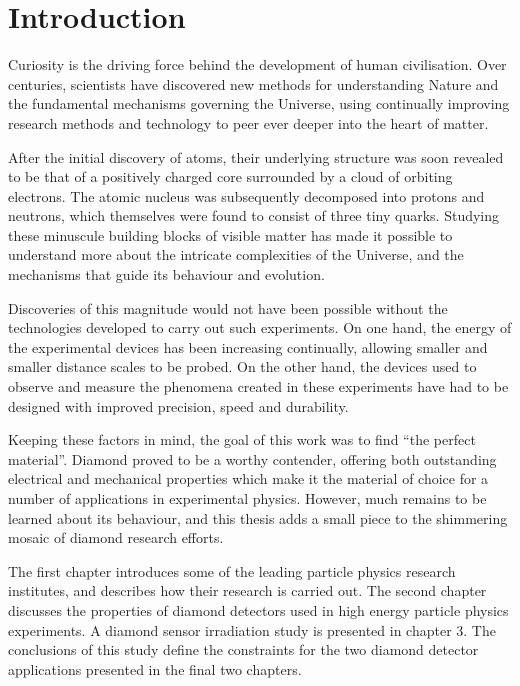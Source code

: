 
\chapter{Introduction}
\label{ch:intro}
Curiosity is the driving force behind the development of human civilisation. Over centuries, scientists have discovered new methods for understanding Nature and the fundamental mechanisms governing the Universe, using continually improving research methods and technology to peer ever deeper into the heart of matter.

After the initial discovery of atoms, their underlying structure was soon revealed to be that of a positively charged core surrounded by a cloud of orbiting electrons. The atomic nucleus was subsequently decomposed into protons and neutrons, which themselves were found to consist of three tiny quarks. Studying these minuscule building blocks of visible matter has made it possible to understand more about the intricate complexities of the Universe, and the mechanisms that guide its behaviour and evolution.

Discoveries of this magnitude would not have been possible without the technologies developed to carry out such experiments. On one hand, the energy of the experimental devices has been increasing continually, allowing smaller and smaller distance scales to be probed. On the other hand, the devices used to observe and measure the phenomena created in these experiments have had to be designed with improved precision, speed and durability. 

Keeping these factors in mind, the goal of this work was to find ``the perfect material''. Diamond proved to be a worthy contender, offering both outstanding electrical and mechanical properties which make it the material of choice for a number of applications in experimental physics. However, much remains to be learned about its behaviour, and this thesis adds a small piece to the shimmering mosaic of diamond research efforts.

The first chapter introduces some of the leading particle physics research institutes, and describes how their research is carried out. The second chapter discusses the properties of diamond detectors used in high energy particle physics experiments. A diamond sensor irradiation study is presented in chapter 3. The conclusions of this study define the constraints for the two diamond detector applications presented in the final two chapters.




